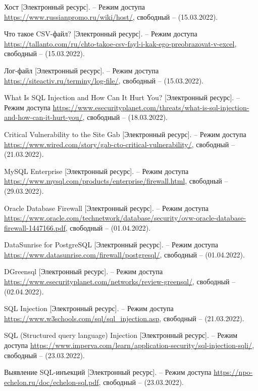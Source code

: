 \begin{thebibliography}{}
    Хост [Электронный ресурс]. – Режим доступа \url{https://www.russianpromo.ru/wiki/host/}, свободный – (15.03.2022). 
    
    Что такое CSV-файл? [Электронный ресурс]. – Режим доступа \url{https://tallanto.com/ru/chto-takoe-csv-fayl-i-kak-ego-preobrazovat-v-excel}, свободный – (15.03.2022).     
    
    
    Лог-файл [Электронный ресурс]. – Режим доступа \url{https://siteactiv.ru/terminy/log-file/}, свободный – (15.03.2022).    

	What Is SQL Injection and How Can It Hurt You? [Электронный ресурс]. – Режим доступа \url{https://www.esecurityplanet.com/threats/what-is-sql-injection-and-how-can-it-hurt-you/}, свободный – (18.03.2022).
	
	Critical Vulnerability to the Site Gab [Электронный ресурс]. – Режим доступа \url{https://www.wired.com/story/gab-cto-critical-vulnerability/}, свободный – (21.03.2022).
	
	MySQL Enterprise [Электронный ресурс]. – Режим доступа \url{https://www.mysql.com/products/enterprise/firewall.html}, свободный – (29.03.2022).	
	
	Oracle Database Firewall [Электронный ресурс]. – Режим доступа \url{https://www.oracle.com/technetwork/database/security/ovw-oracle-database-firewall-1447166.pdf}, свободный – (01.04.2022).	
	
	DataSunrise for PostgreSQL [Электронный ресурс]. – Режим доступа \url{https://www.datasunrise.com/firewall/postgresql/}, свободный – (01.04.2022).	
	
	DGreensql [Электронный ресурс]. – Режим доступа \url{https://www.esecurityplanet.com/networks/review-greensql/}, свободный – (02.04.2022).	
	
    SQL Injection [Электронный ресурс]. – Режим доступа \url{https://www.w3schools.com/sql/sql_injection.asp}, свободный – (21.03.2022).
	
	SQL (Structured query language) Injection [Электронный ресурс]. – Режим доступа \url{https://www.imperva.com/learn/application-security/sql-injection-sqli/}, свободный – (23.03.2022).
	
	Выявление SQL-инъекций [Электронный ресурс]. – Режим доступа \url{https://npo-echelon.ru/doc/echelon-sql.pdf}, свободный – (23.03.2022).
	

\end{thebibliography}
